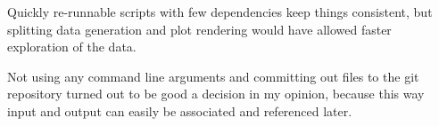 \documentclass[../main.tex]{subfiles}
\begin{document}
Quickly re-runnable scripts with few dependencies keep things consistent, but splitting data generation and plot rendering would have allowed faster exploration of the data.

Not using any command line arguments and committing out files to the git repository turned out to be good a decision in my opinion, because this way input and output can easily be associated and referenced later.
\end{document}
